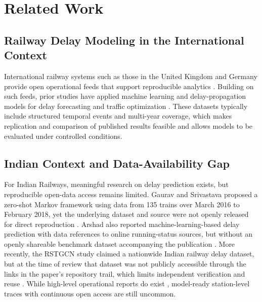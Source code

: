 \documentclass[conference]{IEEEtran}
\begin{document}
\section{Related Work}
\label{sec:related}

\subsection{Railway Delay Modeling in the International Context}
International railway systems such as those in the United Kingdom and Germany provide open operational feeds that support reproducible analytics \cite{uk_rail_data,german_rail_data}. Building on such feeds, prior studies have applied machine learning and delay-propagation models for delay forecasting and traffic optimization \cite{oneto2018train,flier2009delay,goverde2010railway}. These datasets typically include structured temporal events and multi-year coverage, which makes replication and comparison of published results feasible and allows models to be evaluated under controlled conditions.

\subsection{Indian Context and Data-Availability Gap}
For Indian Railways, meaningful research on delay prediction exists, but reproducible open-data access remains limited. Gaurav and Srivastava proposed a zero-shot Markov framework using data from 135 trains over March 2016 to February 2018, yet the underlying dataset and source were not openly released for direct reproduction \cite{gaurav2018zeroshot}. Arshad also reported machine-learning-based delay prediction with data references to online running-status sources, but without an openly shareable benchmark dataset accompanying the publication \cite{arshad2019prediction}. More recently, the RSTGCN study claimed a nationwide Indian railway delay dataset, but at the time of review that dataset was not publicly accessible through the links in the paper's repository trail, which limits independent verification and reuse \cite{chowdhury2025rstgcn}. While high-level operational reports do exist \cite{indian_railways_stats}, model-ready station-level traces with continuous open access are still uncommon.
\end{document}
